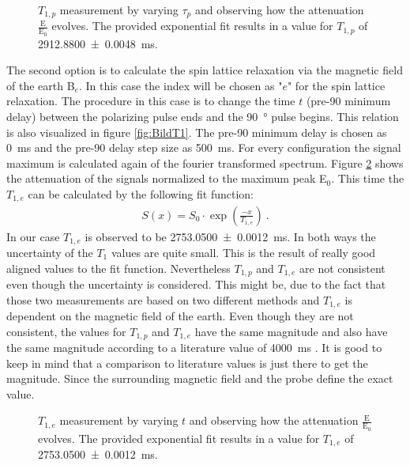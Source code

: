 \begin{figure}[H]
    \centering
    
    \caption[$T_{1,p}$ measurement by varying $\tau_p$ and observing how the attenuation $\frac{\text{E}}{\text{E}_0}$ evolves.]{$T_{1,p}$ measurement by varying $\tau_p$ and observing how the attenuation $\frac{\text{E}}{\text{E}_0}$ evolves.
    The provided exponential fit results in a value for $T_{1,p}$ of \SI{2912.8800 \pm 0.0048}{\milli \second}.}
    \label{fig:T1Polarisationsfeldfeld}
\end{figure}

The second option is to calculate the spin lattice relaxation via the magnetic field of the earth B$_e$.
In this case the index will be chosen as "$e$" for the spin lattice relaxation.
The procedure in this case is to change the time $t$ (pre-90 minimum delay) between the polarizing pulse ends and the \SI{90}{\degree} pulse begins.
This relation is also visualized in figure \ref{fig:BildT1}.
The pre-90 minimum delay is chosen as \SI{0}{\milli \second} and the pre-90 delay step size as \SI{500}{\milli \second}.
For every configuration the signal maximum is calculated again of the fourier transformed spectrum.
Figure \ref{fig:T1Erdmagnetfeld} shows the attenuation of the signals normalized to the maximum peak E$_0$.
This time the $T_{1,e}$ can be calculated by the following fit function:
\begin{align}
    S(x) = S_0 \cdot \exp\left(\frac{-x}{T_{1,e}}\right) \ .
    \label{eq: fitBe}
\end{align}
In our case $T_{1,e}$ is observed to be \SI{2753.0500 \pm 0.0012}{\milli \second}.\newline
In both ways the uncertainty of the $T_1$ values are quite small.
This is the result of really good aligned values to the fit function.
Nevertheless $T_{1,p}$ and $T_{1,e}$ are not consistent even though the uncertainty is considered.
This might be, due to the fact that those two measurements are based on two different methods and $T_{1,e}$ is dependent on the magnetic field of the earth.
Even though they are not consistent, the values for $T_{1,p}$ and $T_{1,e}$ have the same magnitude and also have the same magnitude according to a literature value of \SI{4000}{\milli \second} \cite{literaturT1}.
It is good to keep in mind that a comparison to literature values is just there to get the magnitude.
Since the surrounding magnetic field and the probe define the exact value.
\begin{figure}[H]
    \centering
    
    \caption[$T_{1,e}$ measurement by varying $t$ and observing how the attenuation $\frac{\text{E}}{\text{E}_0}$ evolves.]{$T_{1,e}$ measurement by varying $t$ and observing how the attenuation $\frac{\text{E}}{\text{E}_0}$ evolves.
    The provided exponential fit results in a value for $T_{1,e}$ of \SI{2753.0500 \pm 0.0012}{\milli \second}.}
    \label{fig:T1Erdmagnetfeld}
\end{figure}